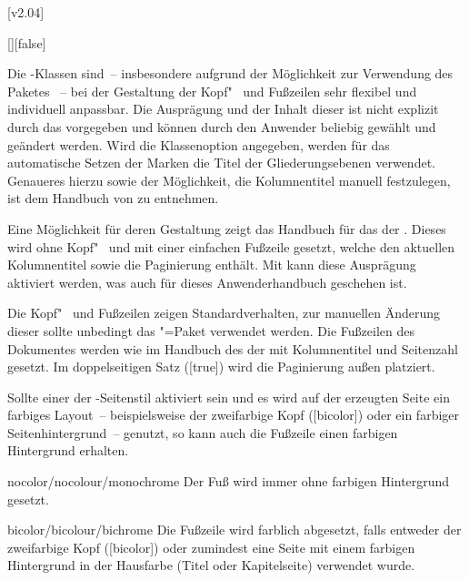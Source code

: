 [v2.04]
\begin{Declaration}{[\PBoolean]}[false]%
\printdeclarationlist%
%

Die \TUDScript-Klassen sind~-- insbesondere aufgrund der Möglichkeit zur 
Verwendung des Paketes ~-- bei der Gestaltung der 
Kopf"~ und Fußzeilen sehr flexibel und individuell anpassbar. Die Ausprägung 
und der Inhalt dieser ist nicht explizit durch das \CD vorgegeben und können 
durch den Anwender beliebig gewählt und geändert werden. Wird die Klassenoption 
 angegeben, werden für das automatische Setzen der Marken die 
Titel der Gliederungsebenen verwendet. Genaueres hierzu sowie der Möglichkeit, 
die Kolumnentitel manuell festzulegen, ist dem Handbuch von \KOMAScript{} zu 
entnehmen.

Eine Möglichkeit für deren Gestaltung zeigt das Handbuch für das \CD der \TnUD. 
Dieses wird ohne Kopf"~ und mit einer einfachen Fußzeile gesetzt, welche den 
aktuellen Kolumnentitel sowie die Paginierung enthält. Mit  kann 
diese Ausprägung aktiviert werden, was auch für dieses Anwenderhandbuch 
geschehen ist.
%
\begin{values}
\itemfalse
  Die Kopf"~ und Fußzeilen zeigen Standardverhalten, zur manuellen Änderung 
  dieser sollte unbedingt das \KOMAScript"=Paket  
  verwendet werden.
\itemtrue*
  Die Fußzeilen des Dokumentes werden wie im Handbuch des \CDs der \TnUD 
  mit Kolumnentitel und Seitenzahl gesetzt. Im doppelseitigen Satz 
  ([true]) wird die Paginierung außen platziert.
\end{values}
%
Sollte einer der -Seitenstil aktiviert sein und es wird 
auf der erzeugten Seite ein farbiges Layout~--  beispielsweise der zweifarbige 
Kopf ([bicolor]) oder ein farbiger Seitenhintergrund~-- genutzt, 
so kann auch die Fußzeile einen farbigen Hintergrund erhalten.
%
\begin{values}
\item[nocolor/nocolour/monochrome]
  Der Fuß wird immer ohne farbigen Hintergrund gesetzt.
\item[bicolor/bicolour/bichrome]
  Die Fußzeile wird farblich abgesetzt, falls entweder der zweifarbige Kopf
  ([bicolor]) oder zumindest eine Seite mit einem farbigen 
  Hintergrund in der Hausfarbe (Titel oder Kapitelseite) verwendet wurde.
\end{values}
\end{Declaration}

